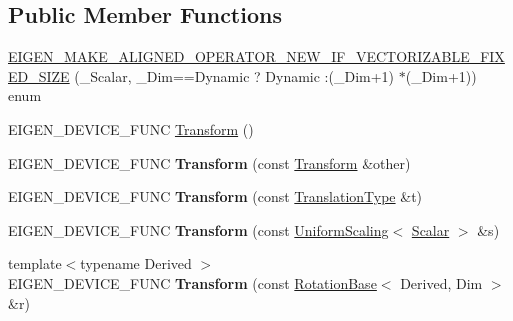 \subsection*{Public Member Functions}
\begin{DoxyCompactItemize}
\item 
\mbox{\hyperlink{class_eigen_1_1_transform_a30c94c2156e9345f4bdb6cc9661e275b}{E\+I\+G\+E\+N\+\_\+\+M\+A\+K\+E\+\_\+\+A\+L\+I\+G\+N\+E\+D\+\_\+\+O\+P\+E\+R\+A\+T\+O\+R\+\_\+\+N\+E\+W\+\_\+\+I\+F\+\_\+\+V\+E\+C\+T\+O\+R\+I\+Z\+A\+B\+L\+E\+\_\+\+F\+I\+X\+E\+D\+\_\+\+S\+I\+ZE}} (\+\_\+\+Scalar, \+\_\+\+Dim==Dynamic ? Dynamic \+:(\+\_\+\+Dim+1) $\ast$(\+\_\+\+Dim+1)) enum
\item 
E\+I\+G\+E\+N\+\_\+\+D\+E\+V\+I\+C\+E\+\_\+\+F\+U\+NC \mbox{\hyperlink{class_eigen_1_1_transform_a79b94ccee0f7871610fa2fa084e0fd59}{Transform}} ()
\item 
\mbox{\label{class_eigen_1_1_transform_a3ab135685493c8a48e701e497bbb1818}} 
E\+I\+G\+E\+N\+\_\+\+D\+E\+V\+I\+C\+E\+\_\+\+F\+U\+NC {\bfseries Transform} (const \mbox{\hyperlink{class_eigen_1_1_transform}{Transform}} \&other)
\item 
\mbox{\label{class_eigen_1_1_transform_adb098a407862f706546443ee47375aed}} 
E\+I\+G\+E\+N\+\_\+\+D\+E\+V\+I\+C\+E\+\_\+\+F\+U\+NC {\bfseries Transform} (const \mbox{\hyperlink{class_eigen_1_1_transform_a6b463d14d8be4c0eda2eed6e943b831f}{Translation\+Type}} \&t)
\item 
\mbox{\label{class_eigen_1_1_transform_a96652ea1105a98cc2f450bd1d62aab49}} 
E\+I\+G\+E\+N\+\_\+\+D\+E\+V\+I\+C\+E\+\_\+\+F\+U\+NC {\bfseries Transform} (const \mbox{\hyperlink{class_eigen_1_1_uniform_scaling}{Uniform\+Scaling}}$<$ \mbox{\hyperlink{class_eigen_1_1_transform_a4e69ced9d651745b8ed4eda46f41795d}{Scalar}} $>$ \&s)
\item 
\mbox{\label{class_eigen_1_1_transform_a1ec4aaba86a9b0fc68f5ae4094e1a395}} 
{\footnotesize template$<$typename Derived $>$ }\\E\+I\+G\+E\+N\+\_\+\+D\+E\+V\+I\+C\+E\+\_\+\+F\+U\+NC {\bfseries Transform} (const \mbox{\hyperlink{class_eigen_1_1_rotation_base}{Rotation\+Base}}$<$ Derived, Dim $>$ \&r)
\item 
\mbox{\label{class_eigen_1_1_transform_abb8128ef929c0e426b9c04d19459f6d8}} 

\end{DoxyCompactItemize}
